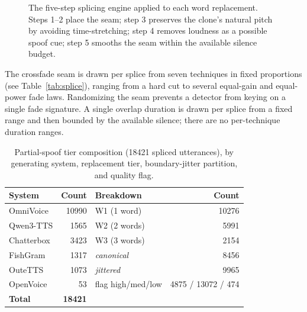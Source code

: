 \documentclass[11pt]{article}
\begin{document}
\begin{figure}[t]
\centering
{}
\caption{The five-step splicing engine applied to each word replacement.
Steps 1--2 place the seam; step 3 preserves the clone's natural pitch by
avoiding time-stretching; step 4 removes loudness as a possible spoof
cue; step 5 smooths the seam within the available silence budget.}
\label{fig:splicesteps}
\end{figure}

The crossfade seam is drawn per splice from seven techniques in fixed
proportions (see Table~\ref{tab:splice}), ranging from a hard cut to several
equal-gain and equal-power fade laws. Randomizing the seam prevents a
detector from keying on a single fade signature. A single overlap
duration is drawn per splice from a fixed range and then bounded by the
available silence; there are no per-technique duration ranges.

\begin{table}[t]
\centering
\caption{Partial-spoof tier composition (18421 spliced utterances),
by generating system, replacement tier, boundary-jitter partition, and
quality flag.}
\label{tab:pscomp}
\small
\begin{tabular}{lr@{\hskip 1.5em}lr}
\toprule
\textbf{System} & \textbf{Count} & \textbf{Breakdown} & \textbf{Count} \\
\midrule
OmniVoice   & 10990 & W1 (1 word)       & 10276 \\
Qwen3-TTS   &  1565 & W2 (2 words)      &  5991 \\
Chatterbox  &  3423 & W3 (3 words)      &  2154 \\
FishGram    &  1317 & \emph{canonical}  &  8456 \\
OuteTTS     &  1073 & \emph{jittered}   &  9965 \\
OpenVoice   &     53   & flag high/med/low & 4875 / 13072 / 474 \\
\midrule
\textbf{Total} & \textbf{18421} & & \\
\bottomrule
\end{tabular}
\end{table}
\end{document}

